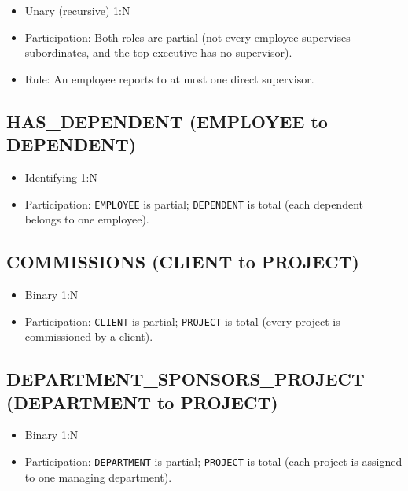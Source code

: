 \documentclass[a4paper,12pt]{report}
\providecommand{\tightlist}{%
  \setlength{\itemsep}{0pt}\setlength{\parskip}{0pt}}
\begin{document}
\begin{itemize}
\tightlist
\item
  Unary (\allowbreak{}recursive) 1:N
\item
  Participation: Both roles are partial (\allowbreak{}not every employee supervises subordinates, and the top executive has no supervisor).
\item
  Rule: An employee reports to at most one direct supervisor.
\end{itemize}

\subsection{\texorpdfstring{HAS\texorpdfstring{\_\allowbreak{}}{_}DEPENDENT (EMPLOYEE to DEPENDENT)}{HASDEPENDENT (EMPLOYEE to DEPENDENT)}}\label{has_dependent-employee-to-dependent}

\begin{itemize}
\tightlist
\item
  Identifying 1:N
\item
  Participation: \texttt{EMPLOYEE} is partial; \texttt{DEPENDENT} is total (\allowbreak{}each dependent belongs to one employee).
\end{itemize}

\subsection{COMMISSIONS (CLIENT to PROJECT)}\label{commissions-client-to-project}

\begin{itemize}
\tightlist
\item
  Binary 1:N
\item
  Participation: \texttt{CLIENT} is partial; \texttt{PROJECT} is total (\allowbreak{}every project is commissioned by a client).
\end{itemize}

\subsection{\texorpdfstring{DEPARTMENT\texorpdfstring{\_\allowbreak{}}{_}SPONSORS\texorpdfstring{\_\allowbreak{}}{_}PROJECT (DEPARTMENT to PROJECT)}{DEPARTMENTSPONSORSPROJECT (DEPARTMENT to PROJECT)}}\label{department_sponsors_project-department-to-project}

\begin{itemize}
\tightlist
\item
  Binary 1:N
\item
  Participation: \texttt{DEPARTMENT} is partial; \texttt{PROJECT} is total (\allowbreak{}each project is assigned to one managing department).
\end{itemize}
\end{document}
